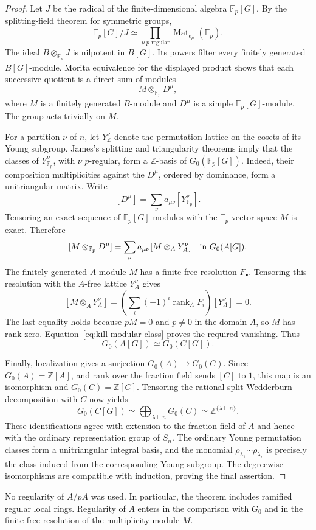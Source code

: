 \begin{proof}
Let $J$ be the radical of the finite-dimensional algebra
$\mathbb F_p[G]$.  By the splitting-field theorem for symmetric groups,
\[
 \mathbb F_p[G]/J\simeq
 \prod_{\mu\ p\text{-regular}}\operatorname{Mat}_{e_\mu}(\mathbb F_p).
\]
The ideal $B\otimes_{\mathbb F_p}J$ is nilpotent in $B[G]$.
Its powers filter every finitely generated $B[G]$-module.  Morita
equivalence for the displayed product shows that each successive
quotient is a direct sum of modules
\[
 M\otimes_{\mathbb F_p}D^\mu,
\]
where $M$ is a finitely generated $B$-module and $D^\mu$ is a simple
$\mathbb F_p[G]$-module.  The group acts trivially on $M$.

For a partition $\nu$ of $n$, let $Y^\nu_{\mathbb Z}$ denote the
permutation lattice on the cosets of its Young subgroup.  James's
splitting and triangularity theorems
\cite[Theorem~11.5, p.~40, and Theorem~12.1, p.~42]{James1978}
imply that the classes of $Y^\nu_{\mathbb F_p}$, with $\nu$
$p$-regular, form a $\mathbb Z$-basis of
$G_0(\mathbb F_p[G])$.  Indeed, their composition multiplicities
against the $D^\mu$, ordered by dominance, form a unitriangular
matrix.  Write
\[
 [D^\mu]=\sum_\nu a_{\mu\nu}[Y^\nu_{\mathbb F_p}].
\]
Tensoring an exact sequence of $\mathbb F_p[G]$-modules with the
$\mathbb F_p$-vector space $M$ is exact.  Therefore
\begin{equation}\label{eq:kill-modular-class}
 [M\otimes_{\mathbb F_p}D^\mu]
 =\sum_\nu a_{\mu\nu}
 [M\otimes_A Y^\nu_A]
 \quad\hbox{in }G_0(A[G]).
\end{equation}
The finitely generated $A$-module $M$ has a finite free resolution
$F_\bullet$.  Tensoring this resolution with the $A$-free lattice
$Y^\nu_A$ gives
\[
 [M\otimes_A Y^\nu_A]
 =\left(\sum_i(-1)^i\operatorname{rank}_A F_i\right)
 [Y^\nu_A]=0.
\]
The last equality holds because $pM=0$ and $p\ne0$ in the domain
$A$, so $M$ has rank zero.  Equation~\eqref{eq:kill-modular-class}
proves the required vanishing.  Thus
\begin{equation}\label{eq:regular-invert-p}
 G_0(A[G])\simeq G_0(C[G]).
\end{equation}

Finally, localization gives a surjection $G_0(A)\to G_0(C)$.
Since $G_0(A)=\mathbb Z[A]$, and rank over the fraction field sends
$[C]$ to $1$, this map is an isomorphism and
$G_0(C)=\mathbb Z[C]$.  Tensoring the rational split Wedderburn
decomposition with $C$ now yields
\[
 G_0(C[G])\simeq\bigoplus_{\lambda\vdash n}G_0(C)
 \simeq\mathbb Z^{\{\lambda\vdash n\}}.
\]
These identifications agree with extension to the fraction field of
$A$ and hence with the ordinary representation group of $S_n$.
The ordinary Young permutation classes form a unitriangular integral
basis, and the monomial $\rho_{\lambda_1}\cdots\rho_{\lambda_r}$
is precisely the class induced from the corresponding Young subgroup.
The degreewise isomorphisms are compatible with induction, proving
the final assertion.
\end{proof}

\begin{remark}
No regularity of $A/pA$ was used.  In particular, the theorem includes
ramified regular local rings.  Regularity of $A$ enters in the
comparison with $G_0$ and in the finite free resolution of the
multiplicity module $M$.
\end{remark}
